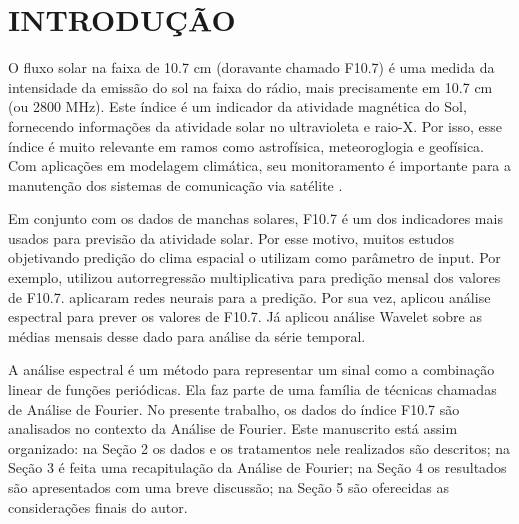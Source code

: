
\chapter{INTRODUÇÃO}

O fluxo solar na faixa de 10.7 cm (doravante chamado F10.7) é uma medida da intensidade da emissão do sol na faixa do rádio, mais precisamente em 10.7 cm (ou 2800 MHz). Este índice é um indicador da atividade magnética do Sol, fornecendo informações da atividade solar no ultravioleta e raio-X. Por isso, esse índice é muito relevante em ramos como astrofísica, meteoroglogia e geofísica. Com aplicações em modelagem climática, seu monitoramento é importante para a manutenção dos sistemas de comunicação via satélite \cite{huang2009forecast}. 

Em conjunto com os dados de manchas solares, F10.7 é um dos indicadores mais usados para previsão da atividade solar. Por esse motivo, muitos estudos objetivando predição do clima espacial o utilizam como parâmetro de input. Por exemplo,  utilizou autorregressão multiplicativa para predição mensal dos valores de F10.7.  aplicaram redes neurais para a predição. Por sua vez,  aplicou análise espectral para prever os valores de F10.7. Já  aplicou análise Wavelet sobre as médias mensais desse dado para análise da série temporal.

A análise espectral é um método para representar um sinal como a combinação linear de funções periódicas. Ela faz parte de uma família de técnicas chamadas de Análise de Fourier. No presente trabalho, os dados do índice F10.7 são analisados no contexto da Análise de Fourier. Este manuscrito está assim organizado: na Seção 2 os dados e os tratamentos nele realizados são descritos; na Seção 3 é feita uma recapitulação da Análise de Fourier; na Seção 4 os resultados são apresentados com uma breve discussão; na Seção 5 são oferecidas as considerações finais do autor.
